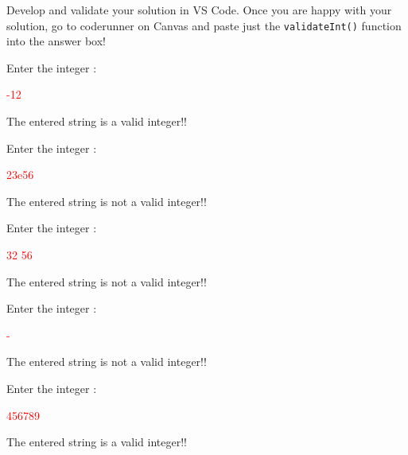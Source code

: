 Develop and validate your solution in VS Code. Once you are happy with your solution, go to coderunner on Canvas and paste just the \texttt{validateInt()} function into the answer box! 

\begin{sample}
Enter the integer :

\textcolor{red}{-12}

The entered string is a valid integer!!
\end{sample}

\begin{sample}
Enter the integer :

\textcolor{red}{23e56}

The entered string is not a valid integer!!
\end{sample}

\begin{sample}
Enter the integer :

\textcolor{red}{32 56}

The entered string is not a valid integer!!
\end{sample}

\begin{sample}
Enter the integer :

\textcolor{red}{-}

The entered string is not a valid integer!!
\end{sample}

\begin{sample}
Enter the integer :

\textcolor{red}{456789}

The entered string is a valid integer!!
\end{sample}
